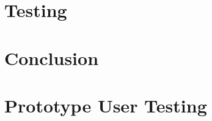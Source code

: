 \documentclass[twoside]{ctuthesis}
\begin{document}
\maketitle









\chapter{Testing}

\chapter{Conclusion}

\appendix

\chapter{Prototype User Testing}
\label{app:questionnaire}


\printindex


\end{document}
